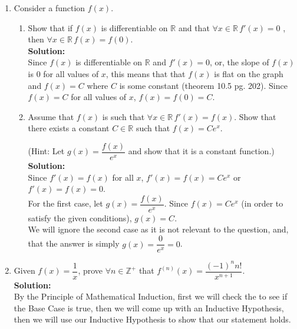 \documentclass[12pt]{book}
\begin{document}
\begin{enumerate}
\newpage

\item Consider a function $f(x)$.

\begin{enumerate}
\item Show that if $f(x)$ is differentiable on $\mathbb{R}$ and that $\forall x \in \mathbb{R} \, f'(x)=0$ , then $\forall x \in \mathbb{R} \, f(x)=f(0)$.\\

\textbf{Solution:}\\
Since $f(x)$ is differentiable on $\mathbb{R}$ and $f'(x) = 0$, or, the slope of $f(x)$ is 0 for all values of $x$, this means that that $f(x)$ is flat on the graph and $f(x) = C$ where $C$ is some constant (theorem 10.5 pg. 202). Since $f(x) = C$ for all values of $x$, $f(x) = f(0) = C$. \\

\item Assume that $f(x)$ is such that $\forall x \in \mathbb{R} \, f'(x)=f(x)$. Show that there exists a constant $C\in\mathbb{R}$ such that $f(x)=Ce^x$. 

(Hint: Let $g(x)=\dfrac{f(x)}{e^x}$ and show that it is a constant function.)\\

\textbf{Solution:}\\
Since $f'(x) = f(x)$ for all $x$, $f'(x) = f(x) = Ce^x$ or $f'(x) = f(x) = 0$.\\

For the first case, let $g(x) = \dfrac{f(x)}{e^x}$. Since $f(x) = Ce^x$ (in order to satisfy the given conditions), $g(x) = C$.\\

We will ignore the second case as it is not relevant to the question, and, that the answer is simply $g(x) = \dfrac{0}{e^x} = 0$.


\end{enumerate}


\newpage

\item Given $f(x)=\dfrac{1}{x}$, prove $\forall n \in \mathbb{Z}^+$ that $f^{(n)}(x) = \dfrac{(-1)^n n!}{x^{n+1}}$. \\

\setcounter{equation}{0}
\textbf{Solution:}\\
By the Principle of Mathematical Induction, first we will check the to see if the Base Case is true, then we will come up with an Inductive Hypothesis, then we will use our Inductive Hypothesis to show that our statement holds.\\


\end{enumerate}
\end{document}
